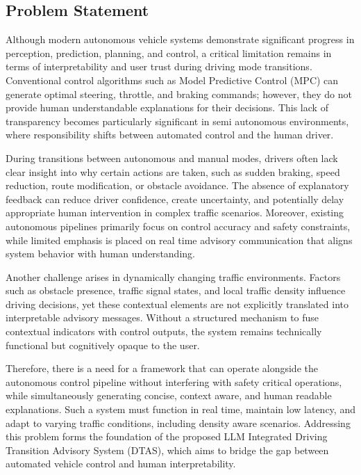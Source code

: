 \documentclass[a4paper,12pt,one side]{report}
\theoremstyle{definition}
\begin{document}
\begin{itemize}
\section{Problem Statement}

Although modern autonomous vehicle \cite{liu2020creating} systems demonstrate significant progress in perception, prediction, planning, and control, a critical limitation remains in terms of interpretability and user trust during driving mode transitions. Conventional control algorithms such as Model Predictive Control (MPC) can generate optimal steering, throttle, and braking commands; however, they do not provide human understandable explanations for their decisions. This lack of transparency becomes particularly significant in semi autonomous environments, where responsibility shifts between automated control and the human driver.

During transitions between autonomous and manual modes, drivers often lack clear insight into why certain actions are taken, such as sudden braking, speed reduction, route modification, or obstacle avoidance. The absence of explanatory feedback can reduce driver confidence, create uncertainty, and potentially delay appropriate human intervention in complex traffic scenarios. Moreover, existing autonomous pipelines primarily focus on control accuracy and safety constraints, while limited emphasis is placed on real time advisory communication that aligns system behavior with human understanding.

Another challenge arises in dynamically changing traffic environments. Factors such as obstacle presence, traffic signal states, and local traffic density influence driving decisions, yet these contextual elements are not explicitly translated into interpretable advisory messages. Without a structured mechanism to fuse contextual indicators with control outputs, the system remains technically functional but cognitively opaque to the user.

Therefore, there is a need for a framework that can operate alongside the autonomous control pipeline without interfering with safety critical operations, while simultaneously generating concise, context aware, and human readable explanations. Such a system must function in real time, maintain low latency, and adapt to varying traffic conditions, including density aware scenarios. Addressing this problem forms the foundation of the proposed LLM Integrated Driving Transition Advisory System (DTAS), which aims to bridge the gap between automated vehicle control and human interpretability.


\end{itemize}
\end{document}
